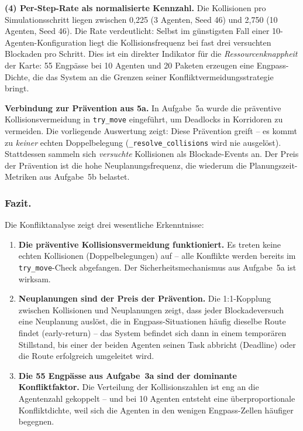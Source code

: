 \textbf{(4) Per-Step-Rate als normalisierte Kennzahl.}
Die Kollisionen pro Simulationsschritt liegen zwischen 0{,}225 (3 Agenten, Seed 46) und 2{,}750 (10 Agenten, Seed 46). Die Rate verdeutlicht: Selbst im günstigsten Fall einer 10-Agenten-Konfiguration liegt die Kollisionsfrequenz bei fast drei versuchten Blockaden pro Schritt. Dies ist ein direkter Indikator für die \textit{Ressourcenknappheit} der Karte: 55 Engpässe bei 10 Agenten und 20 Paketen erzeugen eine Engpass-Dichte, die das System an die Grenzen seiner Konfliktvermeidungsstrategie bringt.

\textbf{Verbindung zur Prävention aus 5a.} In Aufgabe~5a wurde die präventive Kollisionsvermeidung in \texttt{try\_move} eingeführt, um Deadlocks in Korridoren zu vermeiden. Die vorliegende Auswertung zeigt: Diese Prävention greift -- es kommt zu \textit{keiner} echten Doppelbelegung (\texttt{\_resolve\_collisions} wird nie ausgelöst). Stattdessen sammeln sich \textit{versuchte} Kollisionen als Blockade-Events an. Der Preis der Prävention ist die hohe Neuplanungsfrequenz, die wiederum die Planungszeit-Metriken aus Aufgabe~5b belastet.

\subsubsection{Fazit.}

Die Konfliktanalyse zeigt drei wesentliche Erkenntnisse:

\begin{enumerate}
    \item \textbf{Die präventive Kollisionsvermeidung funktioniert.} Es treten keine echten Kollisionen (Doppelbelegungen) auf -- alle Konflikte werden bereits im \texttt{try\_move}-Check abgefangen. Der Sicherheitsmechanismus aus Aufgabe~5a ist wirksam.
    \item \textbf{Neuplanungen sind der Preis der Prävention.} Die 1:1-Kopplung zwischen Kollisionen und Neuplanungen zeigt, dass jeder Blockadeversuch eine Neuplanung auslöst, die in Engpass-Situationen häufig dieselbe Route findet (early-return) -- das System befindet sich dann in einem temporären Stillstand, bis einer der beiden Agenten seinen Task abbricht (Deadline) oder die Route erfolgreich umgeleitet wird.
    \item \textbf{Die 55 Engpässe aus Aufgabe~3a sind der dominante Konfliktfaktor.} Die Verteilung der Kollisionszahlen ist eng an die Agentenzahl gekoppelt -- und bei 10 Agenten entsteht eine überproportionale Konfliktdichte, weil sich die Agenten in den wenigen Engpass-Zellen häufiger begegnen.
\end{enumerate}

